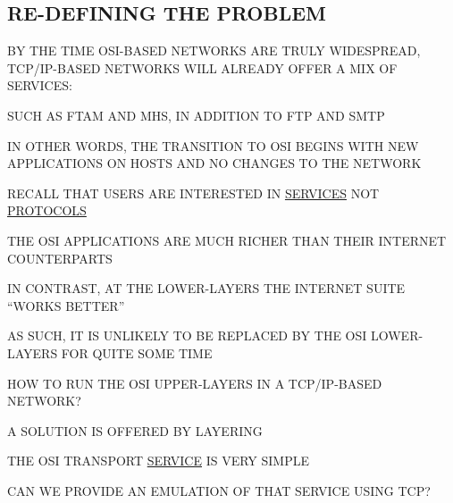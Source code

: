 \begin{bwslide}
\part	{RE-DEFINING THE PROBLEM}\bf

\begin{nrtc}
\item	BY THE TIME OSI-BASED NETWORKS ARE TRULY WIDESPREAD,
	TCP/IP-BASED NETWORKS WILL ALREADY OFFER A MIX OF SERVICES:
    \begin{nrtc}
    \item	SUCH AS FTAM AND MHS, IN ADDITION TO FTP AND SMTP
    \end{nrtc}

\item	IN OTHER WORDS, THE TRANSITION TO OSI BEGINS WITH NEW APPLICATIONS ON
	HOSTS AND NO CHANGES TO THE NETWORK
\end{nrtc}
\end{bwslide}


\begin{bwslide}

\begin{nrtc}
\item	RECALL THAT USERS ARE INTERESTED IN \underline{SERVICES} NOT
	\underline{PROTOCOLS}

\item	THE OSI APPLICATIONS ARE MUCH RICHER THAN THEIR INTERNET COUNTERPARTS

\item	IN CONTRAST, AT THE LOWER-LAYERS THE INTERNET SUITE ``WORKS BETTER''
    \begin{nrtc}
    \item	AS SUCH, IT IS UNLIKELY TO BE REPLACED BY THE OSI LOWER-LAYERS
		FOR QUITE SOME TIME
    \end{nrtc}
\end{nrtc}
\end{bwslide}


\begin{bwslide}

\begin{nrtc}
\item	HOW TO RUN THE OSI UPPER-LAYERS IN A TCP/IP-BASED NETWORK?

\item	A SOLUTION IS OFFERED BY LAYERING
    \begin{nrtc}
    \item	THE OSI TRANSPORT \underline{SERVICE} IS VERY SIMPLE

    \item	CAN WE PROVIDE AN EMULATION OF THAT SERVICE USING TCP?
    \end{nrtc}
\end{nrtc}
\end{bwslide}


